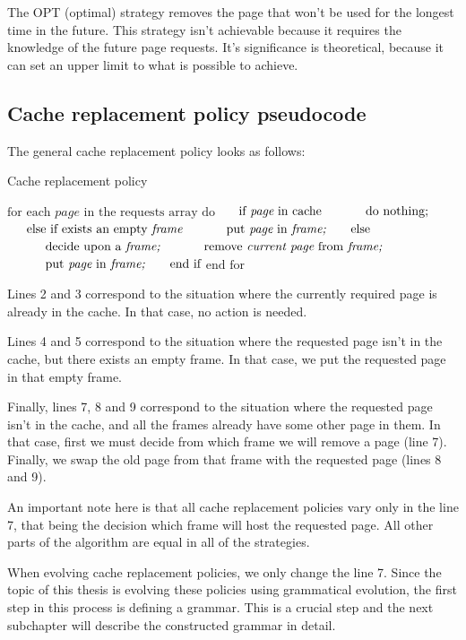The OPT (optimal) strategy removes the page that won't be used for the longest time in the future. This strategy isn't achievable because it requires the knowledge of the future page requests. It's significance is theoretical, because it can set an upper limit to what is possible to achieve.

\subsection{Cache replacement policy pseudocode}
The general cache replacement policy looks as follows:

\begin{algorithm}[]
\caption{Cache replacement policy}
\begin{algorithmic}[1]
\State $\text{for each } \textit{page} \text{ in the requests array do}$
\State $\indent \text{if } \textit{page} \text{ in cache} $
\State $\indent \indent \text{do nothing;} $
\State $\indent \text{else if exists an empty } \textit{frame} $
\State $\indent \indent \text{put } \textit{page} \text{ in } \textit{frame;} $
\State $\indent \text{else} $
\State $\indent \indent \text{decide upon a } \textit{frame;}$
\State $\indent \indent \text{remove } \textit{current page} 
\text{ from } \textit{frame;}$
\State $\indent \indent \text{put } \textit{page} \text{ in } \textit{frame;} $
\State $\indent \text{end if}$
\State $\text{end for}$
\end{algorithmic}
\end{algorithm}

Lines 2 and 3 correspond to the situation where the currently required page is already in the cache. In that case, no action is needed.

Lines 4 and 5 correspond to the situation where the requested page isn't in the cache, but there exists an empty frame. In that case, we put the requested page in that empty frame.

Finally, lines 7, 8 and 9 correspond to the situation where the requested page isn't in the cache, and all the frames already have some other page in them. In that case, first we must decide from which frame we will remove a page (line 7). Finally, we swap the old page from that frame with the requested page (lines 8 and 9).

An important note here is that all cache replacement policies vary only in the line 7, that being the decision which frame will host the requested page. All other parts of the algorithm are equal in all of the strategies. 

When evolving cache replacement policies, we only change the line 7. Since the topic of this thesis is evolving these policies using grammatical evolution, the first step in this process is defining a grammar. This is a crucial step and the next subchapter will describe the constructed grammar in detail.